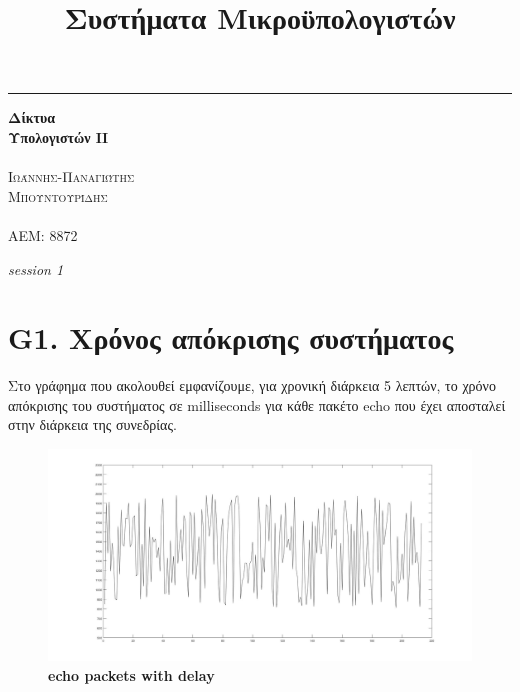 \documentclass{article}
\date{\vspace{-4ex}}
\title{Συστήματα Μικροϋπολογιστών}
\begin{document}
\begin{titlepage} %
	
	\raggedleft %
	
	\rule{1pt}{\textheight} %
	\hspace{0.05\textwidth} %
	\parbox[b]{0.75\textwidth}{ %
		
		{\Huge\bfseries Δίκτυα \\[0.5\baselineskip] Υπολογιστών ΙI}\\[2\baselineskip] %
		{\large\textit{ }}\\[4\baselineskip] %
		{\Large\textsc{Ιωάννης-Παναγιώτης \\Μπουντουρίδης}} %
	\\	\\{\large\textsc{ΑΕΜ: 8872}} %
		
		\vspace{0.5\textheight} %
		
		{\noindent \textit{session 1}}\\[\baselineskip] %
	}

\end{titlepage}

\newpage
\large{}
\section*{G1. Χρόνος απόκρισης συστήματος}
Στο γράφημα που ακολουθεί εμφανίζουμε, για χρονική διάρκεια 5 λεπτών, το χρόνο απόκρισης του
συστήματος σε milliseconds για κάθε πακέτο echo που έχει αποσταλεί στην διάρκεια της συνεδρίας.

\begin{figure}[h!]
 \begin{center}
 \advance\leftskip-4cm
  \includegraphics[width=200mm,scale=0.7]{g1s1.jpg}
  \caption*{\textbf{echo packets with delay}}
  
\end{center}
\end{figure}
\end{document}
